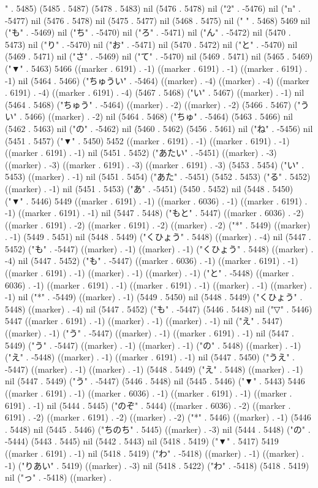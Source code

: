 " . 5485) (5485 . 5487) (5478 . 5483) nil (5476 . 5478) nil ("2" . -5476) nil ("n" . -5477) nil (5476 . 5478) nil (5475 . 5477) nil (5468 . 5475) nil (" " . 5468) 5469 nil ("も" . -5469) nil ("ち" . -5470) nil ("ろ" . -5471) nil ("ん" . -5472) nil (5470 . 5473) nil ("り" . -5470) nil ("お" . -5471) nil (5470 . 5472) nil ("と" . -5470) nil (5469 . 5471) nil ("さ" . -5469) nil ("て" . -5470) nil (5469 . 5471) nil (5465 . 5469) ("▼" . 5463) 5466 ((marker . 6191) . -1) ((marker . 6191) . -1) ((marker . 6191) . -1) nil (5464 . 5466) ("ちゅうい" . -5464) ((marker) . -4) ((marker) . -4) ((marker . 6191) . -4) ((marker . 6191) . -4) (5467 . 5468) ("い" . 5467) ((marker) . -1) nil (5464 . 5468) ("ちゅう" . -5464) ((marker) . -2) ((marker) . -2) (5466 . 5467) ("うい" . 5466) ((marker) . -2) nil (5464 . 5468) ("ちゅ" . -5464) (5463 . 5466) nil (5462 . 5463) nil ("の" . -5462) nil (5460 . 5462) (5456 . 5461) nil ("ね" . -5456) nil (5451 . 5457) ("▼" . 5450) 5452 ((marker . 6191) . -1) ((marker . 6191) . -1) ((marker . 6191) . -1) nil (5451 . 5452) ("あたい" . -5451) ((marker) . -3) ((marker) . -3) ((marker . 6191) . -3) ((marker . 6191) . -3) (5453 . 5454) ("い" . 5453) ((marker) . -1) nil (5451 . 5454) ("あた" . -5451) (5452 . 5453) ("る" . 5452) ((marker) . -1) nil (5451 . 5453) ("あ" . -5451) (5450 . 5452) nil (5448 . 5450) ("▼" . 5446) 5449 ((marker . 6191) . -1) ((marker . 6036) . -1) ((marker . 6191) . -1) ((marker . 6191) . -1) nil (5447 . 5448) ("もと" . 5447) ((marker . 6036) . -2) ((marker . 6191) . -2) ((marker . 6191) . -2) ((marker) . -2) ("*" . 5449) ((marker) . -1) (5449 . 5451) nil (5448 . 5449) ("くひょう" . 5448) ((marker) . -4) nil (5447 . 5452) ("も" . -5447) ((marker) . -1) ((marker) . -1) ("くひょう" . 5448) ((marker) . -4) nil (5447 . 5452) ("も" . -5447) ((marker . 6036) . -1) ((marker . 6191) . -1) ((marker . 6191) . -1) ((marker) . -1) ((marker) . -1) ("と" . -5448) ((marker . 6036) . -1) ((marker . 6191) . -1) ((marker . 6191) . -1) ((marker) . -1) ((marker) . -1) nil ("*" . -5449) ((marker) . -1) (5449 . 5450) nil (5448 . 5449) ("くひょう" . 5448) ((marker) . -4) nil (5447 . 5452) ("も" . -5447) (5446 . 5448) nil ("▽" . 5446) 5447 ((marker . 6191) . -1) ((marker) . -1) ((marker) . -1) nil ("え" . 5447) ((marker) . -1) ("う" . -5447) ((marker) . -1) ((marker . 6191) . -1) nil (5447 . 5449) ("う" . -5447) ((marker) . -1) ((marker) . -1) ("の" . 5448) ((marker) . -1) ("え" . -5448) ((marker) . -1) ((marker . 6191) . -1) nil (5447 . 5450) ("うえ" . -5447) ((marker) . -1) ((marker) . -1) (5448 . 5449) ("え" . 5448) ((marker) . -1) nil (5447 . 5449) ("う" . -5447) (5446 . 5448) nil (5445 . 5446) ("▼" . 5443) 5446 ((marker . 6191) . -1) ((marker . 6036) . -1) ((marker . 6191) . -1) ((marker . 6191) . -1) nil (5444 . 5445) ("のぞ" . 5444) ((marker . 6036) . -2) ((marker . 6191) . -2) ((marker . 6191) . -2) ((marker) . -2) ("*" . 5446) ((marker) . -1) (5446 . 5448) nil (5445 . 5446) ("ちのち" . 5445) ((marker) . -3) nil (5444 . 5448) ("の" . -5444) (5443 . 5445) nil (5442 . 5443) nil (5418 . 5419) ("▼" . 5417) 5419 ((marker . 6191) . -1) nil (5418 . 5419) ("わ" . -5418) ((marker) . -1) ((marker) . -1) ("りあい" . 5419) ((marker) . -3) nil (5418 . 5422) ("わ" . -5418) (5418 . 5419) nil ("っ" . -5418) ((marker) . 